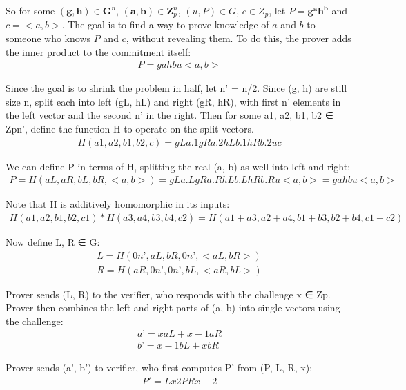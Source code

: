 \documentclass{article}
\begin{document}
So for some $(\textbf{g}, \textbf{h}) \in \textbf{G}^n$, $(\textbf{a}, \textbf{b}) \in \textbf{Z}_p^n$, $(u, P) \in G$, $c \in Z_p$, let $P = \textbf{g}^\textbf{a} \textbf{h}^\textbf{b}$ and $c = <a, b>$.  The goal is to find a way to prove knowledge of $a$ and $b$ to someone who knows $P$ and $c$, without revealing them.  To do this, the prover adds the inner product to the commitment itself:
\begin{eqnarray}
  P = ga hb u<a, b>
\end{eqnarray}

Since the goal is to shrink the problem in half, let n’ = n/2.  Since (g, h) are still size n, split each into left (gL, hL) and right (gR, hR), with first n’ elements in the left vector and the second n’ in the right.  Then for some a1, a2, b1, b2 ∈ Zpn’, define the function H to operate on the split vectors. 
\begin{eqnarray}
  H(a1, a2, b1, b2, c) = gLa.1 gRa.2 hLb.1 hRb.2 uc
\end{eqnarray}

We can define P in terms of H, splitting the real (a, b) as well into left and right:
\begin{eqnarray}
  P = H(aL, aR, bL, bR, <a, b>) = gLa.L gRa.R hLb.L hRb.R u<a, b> = ga hb u<a, b>
\end{eqnarray}

Note that H is additively homomorphic in its inputs:
\begin{eqnarray}
  H(a1, a2, b1, b2, c1)*H(a3, a4, b3, b4, c2) = H(a1 + a3, a2 + a4, b1 + b3, b2 + b4, c1+c2)
\end{eqnarray}

Now define L, R ∈ G:
\begin{eqnarray}
  L = H(0n’, aL, bR, 0n’, <aL, bR>)\\
  R = H(aR, 0n’, 0n’, bL, <aR, bL>)
\end{eqnarray}

Prover sends (L, R) to the verifier, who responds with the challenge x ∈ Zp.  Prover then combines the left and right parts of (a, b) into single vectors using the challenge:
\begin{eqnarray}
  a’ = x aL + x-1 aR\\
  b’ = x-1 bL + x bR
\end{eqnarray}

Prover sends (a’, b’) to verifier, who first computes P' from (P, L, R, x):
\begin{eqnarray}
  P'=Lx2PRx-2
\end{eqnarray}
\end{document}

